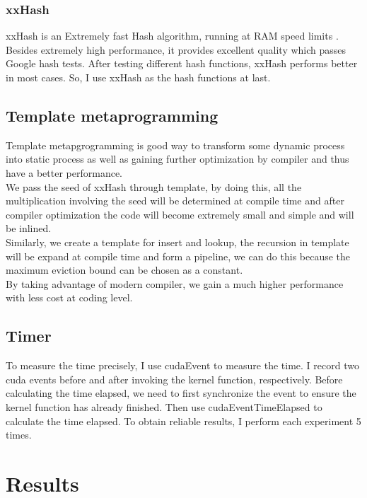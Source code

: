 \documentclass[10pt,twocolumn,letterpaper]{article}
\begin{document}
\subsubsection{xxHash}

xxHash is an Extremely fast Hash algorithm, running at RAM speed limits \cite{collet2016xxhash}. Besides extremely high performance, it provides excellent quality which passes Google hash tests. After testing different hash functions, xxHash performs better in most cases. So, I use xxHash as the hash functions at last.

\subsection{Template metaprogramming}

Template metapgrogramming is good way to transform some dynamic process into static process as well as gaining further optimization by compiler and thus have a better performance. \\
We pass the seed of xxHash through template, by doing this, all the multiplication involving the seed will be determined at compile time and after compiler optimization the code will become extremely small and simple and will be inlined.\\
Similarly, we create a template for insert and lookup, the recursion in template will be expand at compile time and form a pipeline, we can do this because the maximum eviction bound can be chosen as a constant.\\
By taking advantage of modern compiler, we gain a much higher performance with less cost at coding level.

\subsection{Timer}

To measure the time precisely, I use cudaEvent to measure the time. I record two cuda events before and after invoking the kernel function, respectively. Before calculating the time elapsed, we need to first synchronize the event to ensure the kernel function has already finished. Then use cudaEventTimeElapsed to calculate the time elapsed. To obtain reliable results, I perform each experiment 5 times. 

\section{Results}
\end{document}
